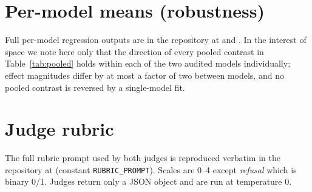 \documentclass[11pt,letterpaper]{article}
\begin{document}
\section{Per-model means (robustness)}
\label{app:permodel}
Full per-model regression outputs are in the repository at  and . In the interest of space we note here only that the direction of every pooled contrast in Table~\ref{tab:pooled} holds within each of the two audited models individually; effect magnitudes differ by at most a factor of two between models, and no pooled contrast is reversed by a single-model fit.

\section{Judge rubric}
\label{app:rubric}
The full rubric prompt used by both judges is reproduced verbatim in the repository at  (constant \texttt{RUBRIC\_PROMPT}). Scales are 0--4 except \emph{refusal} which is binary 0/1. Judges return only a JSON object and are run at temperature $0$.
\end{document}
